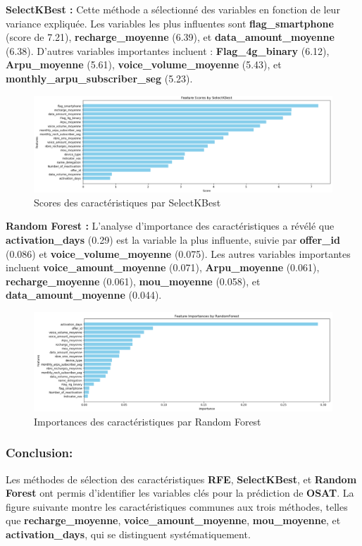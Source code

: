 \textbf{SelectKBest :} Cette méthode a sélectionné des variables en fonction de leur variance expliquée. Les variables les plus influentes sont \textbf{flag\_smartphone} (score de 7.21), \textbf{recharge\_moyenne} (6.39), et \textbf{data\_amount\_moyenne} (6.38). D'autres variables importantes incluent :
\textbf{Flag\_4g\_binary} (6.12), \textbf{Arpu\_moyenne} (5.61), \textbf{voice\_volume\_moyenne} (5.43), et \textbf{monthly\_arpu\_subscriber\_seg} (5.23).

\begin{figure}[H]
    \centering
    \includegraphics[width=0.8\linewidth]{capture_sas_66.png}
    \caption{Scores des caractéristiques par SelectKBest}
\end{figure}

\textbf{Random Forest :} L'analyse d'importance des caractéristiques a révélé que \textbf{activation\_days} (0.29) est la variable la plus influente, suivie par \textbf{offer\_id} (0.086) et \textbf{voice\_volume\_moyenne} (0.075). Les autres variables importantes incluent \textbf{voice\_amount\_moyenne} (0.071), \textbf{Arpu\_moyenne} (0.061), \textbf{recharge\_moyenne} (0.061), \textbf{mou\_moyenne} (0.058), et \textbf{data\_amount\_moyenne} (0.044).

\begin{figure}[H]
    \centering
    \includegraphics[width=0.8\linewidth]{capture_sas_67.png}
    \caption{Importances des caractéristiques par Random Forest}
\end{figure}


\subsubsection*{Conclusion:}
Les méthodes de sélection des caractéristiques \textbf{RFE}, \textbf{SelectKBest}, et \textbf{Random Forest} ont permis d'identifier les variables clés pour la prédiction de \textbf{OSAT}. La figure suivante montre les caractéristiques communes aux trois méthodes, telles que \textbf{recharge\_moyenne}, \textbf{voice\_amount\_moyenne}, \textbf{mou\_moyenne}, et \textbf{activation\_days}, qui se distinguent systématiquement.


